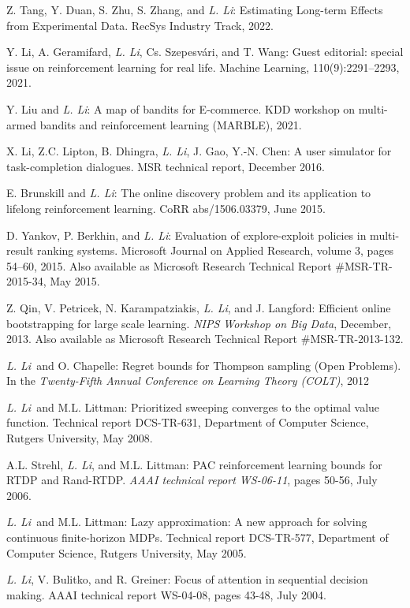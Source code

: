 \documentclass[10pt,twoside,letterpaper]{article}
\newcommand{\selffont}[1]{{\textit{#1}}}
\newcommand{\venuefont}[1]{{\textit{#1}}}
\newcommand{\negitemspace}{\vspace{1mm}}
\newcommand{\myself}{\selffont{L. Li}}
\begin{document}
\begin{compactenum}[(O1)]

\item{Z. Tang, Y. Duan, S. Zhu, S. Zhang, and \myself: Estimating Long-term Effects from Experimental Data. RecSys Industry Track, 2022.}

\item{Y. Li, A.  Geramifard, \myself, Cs. Szepesv\'{a}ri, and T. Wang: Guest editorial: special issue on reinforcement learning for real life. Machine Learning, 110(9):2291--2293, 2021.}

\item{Y. Liu and \myself: A map of bandits for E-commerce. KDD workshop on multi-armed bandits and reinforcement learning (MARBLE), 2021.}

\item{X. Li, Z.C. Lipton, B. Dhingra, \myself, J. Gao, Y.-N. Chen: A user simulator for task-completion dialogues.  MSR technical report, December 2016.}

\item{E. Brunskill and \myself: The online discovery problem and its application to lifelong reinforcement learning.  CoRR abs/1506.03379, June 2015.}

\item{D. Yankov, P. Berkhin, and \myself: Evaluation of explore-exploit policies in multi-result ranking systems.  Microsoft Journal on Applied Research, volume 3, pages 54--60, 2015.  Also available as Microsoft Research Technical Report \#MSR-TR-2015-34, May 2015.}

\item{Z. Qin, V. Petricek, N. Karampatziakis, \myself, and J. Langford: Efficient online bootstrapping for large scale learning.  \venuefont{NIPS Workshop on Big Data}, December, 2013.  Also available as Microsoft Research Technical Report \#MSR-TR-2013-132.}

\item{\myself\ and O. Chapelle: Regret bounds for Thompson sampling (Open Problems).  In the \venuefont{Twenty-Fifth Annual Conference on Learning Theory (COLT)}, 2012}

\item{\myself\ and M.L. Littman: Prioritized sweeping converges to the optimal value function.  Technical report DCS-TR-631, Department of Computer Science, Rutgers University, May 2008.}

\item{A.L. Strehl, \myself, and M.L. Littman: PAC reinforcement learning bounds for RTDP and Rand-RTDP.  \venuefont{AAAI technical report WS-06-11}, pages 50-56, July 2006.}

\item{\myself\ and M.L. Littman: Lazy approximation: A new approach for solving continuous finite-horizon MDPs.  Technical report DCS-TR-577, Department of Computer Science, Rutgers University, May 2005.}

\item{\myself, V. Bulitko, and R. Greiner: Focus of attention in sequential decision making. AAAI technical report WS-04-08, pages 43-48, July 2004.}

\end{compactenum} \negitemspace
\end{document}
